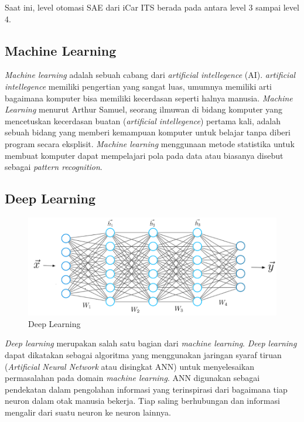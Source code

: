 Saat ini, level otomasi SAE dari iCar ITS berada pada antara level 3 sampai level 4. \cite{cit:icar_its_news}

\subsection{Machine Learning}

\textit{Machine learning} adalah sebuah cabang dari \textit{artificial intellegence} (AI). \textit{artificial intellegence} memiliki pengertian yang sangat luas, umumnya memiliki arti bagaimana komputer bisa memiliki kecerdasan seperti halnya manusia. \textit{Machine Learning }menurut Arthur Samuel, seorang ilmuwan di bidang komputer yang mencetuskan kecerdasan buatan (\textit{artificial intellegence}) pertama kali, adalah sebuah bidang yang memberi kemampuan komputer untuk belajar tanpa diberi program secara eksplisit. \textit{Machine learning} menggunaan metode statistika untuk membuat komputer dapat mempelajari pola pada data atau biasanya disebut sebagai \textit{pattern recognition}. \cite{cit:ml_patternrecog}

\subsection{Deep Learning}
\begin{figure}[H] 
	\centering
	\includegraphics[width=.4\linewidth]{images/deep_learning}
	\caption{Deep Learning}
	\label{fig:deep_learning}
\end{figure}
\textit{Deep learning} merupakan salah satu bagian dari \textit{machine learning}. \textit{Deep learning} dapat dikatakan sebagai algoritma yang menggunakan jaringan syaraf tiruan (\textit{Artificial Neural Network} atau disingkat ANN) untuk menyelesaikan permasalahan pada domain \textit{machine learning}. ANN digunakan sebagai pendekatan dalam pengolahan informasi yang terinspirasi dari bagaimana tiap neuron dalam otak manusia bekerja. Tiap saling berhubungan dan informasi mengalir dari suatu neuron ke neuron lainnya. \cite{cit:deep_learning}

